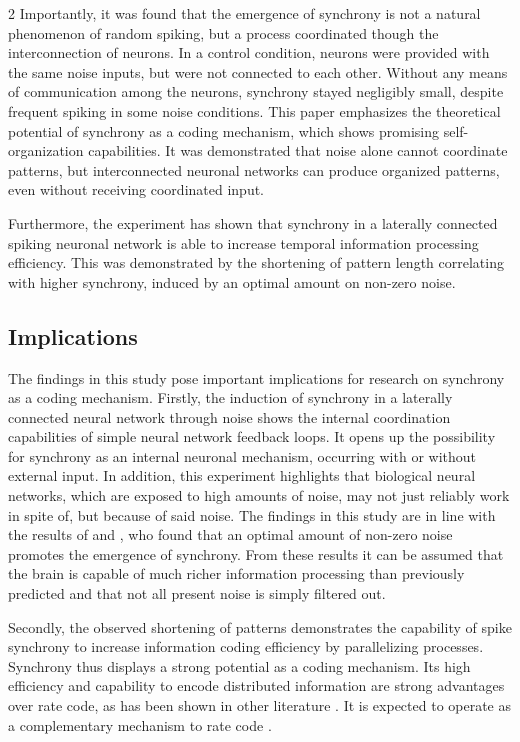 \documentclass[12pt,a4paper]{article}
\begin{document}
\begin{multicols}{2}
            Importantly, it was found that the emergence of synchrony is not a natural phenomenon of random spiking, but a process coordinated though the interconnection of neurons. In a control condition, neurons were provided with the same noise inputs, but were not connected to each other. Without any means of communication among the neurons, synchrony stayed negligibly small, despite frequent spiking in some noise conditions. This paper emphasizes the theoretical potential of synchrony as a coding mechanism, which shows promising self-organization capabilities. It was demonstrated that noise alone cannot coordinate patterns, but interconnected neuronal networks can produce organized patterns, even without receiving coordinated input.

            Furthermore, the experiment has shown that synchrony in a laterally connected spiking neuronal network is able to increase temporal information processing efficiency. This was demonstrated by the shortening of pattern length correlating with higher synchrony, induced by an optimal amount on non-zero noise.
            
        \subsection {Implications}
            The findings in this study pose important implications for research on synchrony as a coding mechanism. Firstly, the induction of synchrony in a laterally connected neural network through noise shows the internal coordination capabilities of simple neural network feedback loops. It opens up the possibility for synchrony as an internal neuronal mechanism, occurring with or without external input. In addition, this experiment 
            highlights that biological neural networks, which are exposed to high amounts of noise, may not just reliably work in spite of, but because of said noise. The findings in this study are in line with the results of \textcite{P} and \textcite{Q}, who found that an optimal amount of non-zero noise promotes the emergence of synchrony. From these results it can be assumed that the brain is capable of much richer information processing than previously predicted and that not all present noise is simply filtered out.
            
            Secondly, the observed shortening of patterns demonstrates the capability of spike synchrony to increase information coding efficiency by parallelizing processes. Synchrony thus displays a strong potential as a coding mechanism. Its high efficiency and capability to encode distributed information are strong advantages over rate code, as has been shown in other literature \cite{R, L}. It is expected to operate as a complementary mechanism to rate code \cite{L, G}.


\end{multicols}
\end{document}
